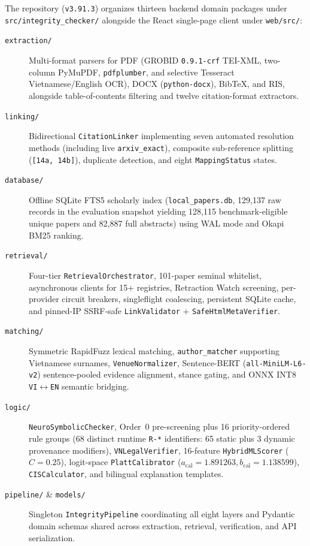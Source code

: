 The repository (\texttt{v3.91.3}) organizes thirteen backend domain packages under \texttt{src/\allowbreak integrity\_checker/} alongside the React single-page client under \texttt{web/src/}:

\begin{description}
    \item[\texttt{extraction/}] Multi-format parsers for PDF (GROBID \texttt{0.9.1-crf} TEI-XML, two-column PyMuPDF, \texttt{pdfplumber}, and selective Tesseract Vietnamese/English OCR), DOCX (\texttt{python-docx}), BibTeX, and RIS, alongside table-of-contents filtering and twelve citation-format extractors.
    \item[\texttt{linking/}] Bidirectional \texttt{CitationLinker} implementing seven automated resolution methods (including live \texttt{arxiv\_exact}), composite sub-reference splitting (\texttt{[14a, 14b]}), duplicate detection, and eight \texttt{MappingStatus} states.
    \item[\texttt{database/}] Offline SQLite FTS5 scholarly index (\texttt{local\_papers.db}, 129,137 raw records in the evaluation snapshot yielding 128,115 benchmark-eligible unique papers and 82,887 full abstracts) using WAL mode and Okapi BM25 ranking.
    \item[\texttt{retrieval/}] Four-tier \texttt{RetrievalOrchestrator}, 101-paper seminal whitelist, asynchronous clients for 15+ registries, Retraction Watch screening, per-provider circuit breakers, singleflight coalescing, persistent SQLite cache, and pinned-IP SSRF-safe \texttt{LinkValidator} + \texttt{SafeHtmlMetaVerifier}.
    \item[\texttt{matching/}] Symmetric RapidFuzz lexical matching, \texttt{author\_matcher} supporting Vietnamese surnames, \texttt{VenueNormalizer}, Sentence-BERT (\texttt{all-MiniLM-\allowbreak{}L6-v2}) sentence-pooled evidence alignment, stance gating, and ONNX INT8 \texttt{VI}$\leftrightarrow$\texttt{EN} semantic bridging.
    \item[\texttt{logic/}] \texttt{NeuroSymbolicChecker}, Order~0 pre-screening plus 16 priority-ordered rule groups (68 distinct runtime \texttt{R-*} identifiers: 65 static plus 3 dynamic provenance modifiers), \texttt{VNLegalVerifier}, 16-feature \texttt{HybridMLScorer} ($C = 0.25$), logit-space \texttt{PlattCalibrator} ($a_{\text{cal}} = 1.891263, b_{\text{cal}} = 1.138599$), \texttt{CISCalculator}, and bilingual explanation templates.
    \item[\texttt{pipeline/} \& \texttt{models/}] Singleton \texttt{IntegrityPipeline} coordinating all eight layers and Pydantic domain schemas shared across extraction, retrieval, verification, and API serialization.

\end{description}
